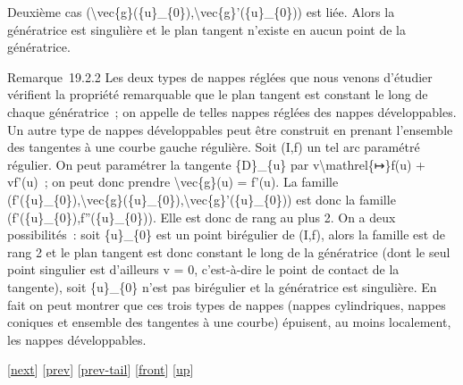 \documentclass[]{article}
\begin{document}
Deuxième cas
(\textbackslash{}vec\{g\}(\{u\}\_\{0\}),\textbackslash{}vec\{g\}'(\{u\}\_\{0\}))
est liée. Alors la génératrice est singulière et le plan tangent
n'existe en aucun point de la génératrice.

Remarque~19.2.2 Les deux types de nappes réglées que nous venons
d'étudier vérifient la propriété remarquable que le plan tangent est
constant le long de chaque génératrice~; on appelle de telles nappes
réglées des nappes développables. Un autre type de nappes développables
peut être construit en prenant l'ensemble des tangentes à une courbe
gauche régulière. Soit (I,f) un tel arc paramétré régulier. On peut
paramétrer la tangente \{D\}\_\{u\} par
v\textbackslash{}mathrel\{↦\}f(u) + vf'(u)~; on peut donc prendre
\textbackslash{}vec\{g\}(u) = f'(u). La famille
(f'(\{u\}\_\{0\}),\textbackslash{}vec\{g\}(\{u\}\_\{0\}),\textbackslash{}vec\{g\}'(\{u\}\_\{0\}))
est donc la famille (f'(\{u\}\_\{0\}),f''(\{u\}\_\{0\})). Elle est donc
de rang au plus 2. On a deux possibilités~: soit \{u\}\_\{0\} est un
point birégulier de (I,f), alors la famille est de rang 2 et le plan
tangent est donc constant le long de la génératrice (dont le seul point
singulier est d'ailleurs v = 0, c'est-à-dire le point de contact de la
tangente), soit \{u\}\_\{0\} n'est pas birégulier et la génératrice est
singulière. En fait on peut montrer que ces trois types de nappes
(nappes cylindriques, nappes coniques et ensemble des tangentes à une
courbe) épuisent, au moins localement, les nappes développables.

{[}\href{coursse102.html}{next}{]} {[}\href{coursse100.html}{prev}{]}
{[}\href{coursse100.html\#tailcoursse100.html}{prev-tail}{]}
{[}\href{coursse101.html}{front}{]}
{[}\href{coursch20.html\#coursse101.html}{up}{]}
\end{document}
